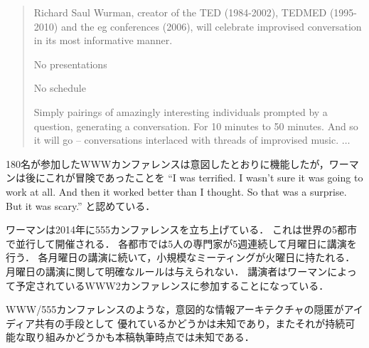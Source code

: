 \documentclass[submit,techreq,jkeyword,noauthor]{ipsj}
\begin{document}
\begin{quote}
Richard Saul Wurman, creator of the TED (1984-2002), TEDMED (1995-2010) and the eg 
conferences (2006), will celebrate improvised conversation in its most informative manner.

No presentations

No schedule

Simply pairings of amazingly interesting individuals prompted by a question, generating a 
conversation. For 10 minutes to 50 minutes. And so it will go – conversations interlaced 
with threads of improvised music. 
% 
% 
% 
% 
% 
% 
$\dots$
\end{quote}

180名が参加したWWWカンファレンスは意図したとおりに機能したが，ワーマンは後にこれが冒険であったことを
``I was terrified. I wasn't sure it was going to work at all. And then it worked better 
than I thought. So that was a surprise. But it was scary.'' と認めている．\cite{ek}



ワーマンは2014年に555カンファレンスを立ち上げている．
これは世界の5都市で並行して開催される．
各都市では5人の専門家が5週連続して月曜日に講演を行う．
各月曜日の講演に続いて，小規模なミーティングが火曜日に持たれる．
月曜日の講演に関して明確なルールは与えられない．
講演者はワーマンによって予定されているWWW2カンファレンスに参加することになっている．\cite{ek}

WWW/555カンファレンスのような，意図的な情報アーキテクチャの隠匿がアイディア共有の手段として
優れているかどうかは未知であり，またそれが持続可能な取り組みかどうかも本稿執筆時点では未知である．
\end{document}
